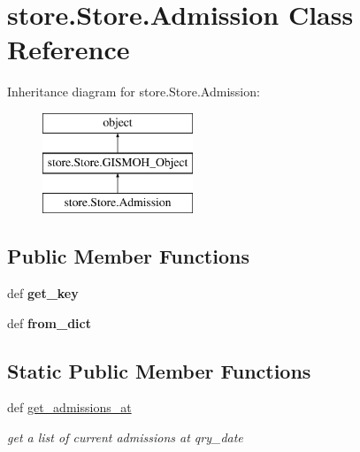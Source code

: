 \hypertarget{classstore_1_1_store_1_1_admission}{\section{store.\-Store.\-Admission Class Reference}
\label{classstore_1_1_store_1_1_admission}
}
Inheritance diagram for store.\-Store.\-Admission\-:\begin{figure}[H]
\begin{center}
\leavevmode
\includegraphics[height=3.000000cm]{classstore_1_1_store_1_1_admission}
\end{center}
\end{figure}
\subsection*{Public Member Functions}
\begin{DoxyCompactItemize}
\item 
\hypertarget{classstore_1_1_store_1_1_admission_a037f609d804b51df827032937ae763f5}{def {\bfseries get\-\_\-key}}\label{classstore_1_1_store_1_1_admission_a037f609d804b51df827032937ae763f5}

\item 
\hypertarget{classstore_1_1_store_1_1_admission_abf584daf4aec1336b308cad23bad1ca4}{def {\bfseries from\-\_\-dict}}\label{classstore_1_1_store_1_1_admission_abf584daf4aec1336b308cad23bad1ca4}

\end{DoxyCompactItemize}
\subsection*{Static Public Member Functions}
\begin{DoxyCompactItemize}
\item 
def \hyperlink{classstore_1_1_store_1_1_admission_a7821af99ac5ade96c0f4cb51191481d6}{get\-\_\-admissions\-\_\-at}
\begin{DoxyCompactList}\small\item\em get a list of current admissions at qry\-\_\-date \end{DoxyCompactList}\end{DoxyCompactItemize}
